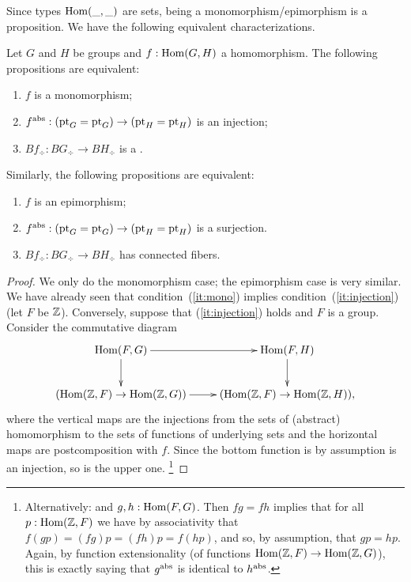 { 
Since types $\mathrm{Hom}(\_,\_)$ are sets, being a monomorphism/epimorphism is a proposition.
We have the following equivalent characterizations.

\begin{lemma}\label{lem:eq-mono-cover}\label{lem:eq-epi-conn}
Let $G$ and $H$ be groups and $f: \mathrm{Hom}(G,H)$ a homomorphism.
The following propositions are equivalent: %
\begin{enumerate}
\item\label{it:mono} $f$ is a monomorphism;
\item\label{it:injection} $f^{\mathrm{abs}}:(\mathrm{pt}_G=\mathrm{pt}_G)\to(\mathrm{pt}_H=\mathrm{pt}_H)$ is an injection;
\item\label{it:cover} $Bf_\div:BG_\div\to BH_\div$ is a \covering.
\end{enumerate}

Similarly, the following propositions are equivalent:
\begin{enumerate}
\item\label{it:epi} $f$ is an epimorphism;
\item\label{it:surjection} $f^{\mathrm{abs}}:(\mathrm{pt}_G=\mathrm{pt}_G)\to(\mathrm{pt}_H=\mathrm{pt}_H)$ is a surjection.
\item\label{it:connfib} $Bf_\div:BG_\div\to BH_\div$ has connected fibers.
\end{enumerate}
\end{lemma}
\begin{proof}
  We only do the monomorphism case; the epimorphism case is very similar.
  We have already seen that condition~(\ref{it:mono}) implies  condition~(\ref{it:injection}) (let $F$ be $\mathbb{Z}$).
    Conversely, suppose that (\ref{it:injection}) holds and $F$ is a group.  Consider the commutative diagram
$$\xymatrix{\Hom(F,G)\ar[r]\ar[d]&\Hom(F,H)\ar[d]\\
  (\Hom(\ZZ,F)\to\Hom(\ZZ,G))\ar[r]&(\Hom(\ZZ,F)\to\Hom(\ZZ,H)),}$$
where the vertical maps are the injections from the sets of (abstract) homomorphism to the sets of functions of underlying sets and the horizontal maps are postcomposition with $f$.  Since the bottom function is by assumption is an injection, so is the upper one.
\footnote{ Alternatively:  and $g,h:\mathrm{Hom}(F,G)$.  Then $fg=fh$ implies that for all $p:\mathrm{Hom}(\mathbb{Z},F)$ we have by associativity that $f(gp)=(fg)p=(fh)p=f(hp)$, and so, by assumption, that $gp=hp$.
  Again, by function extensionality (of functions $\mathrm{Hom}(\mathbb{Z},F)\to\mathrm{Hom}(\mathbb{Z},G)$), this is exactly saying that $g^{\mathrm{abs}}$ is identical to $h^{\mathrm{abs}}$.}


\end{proof}}
